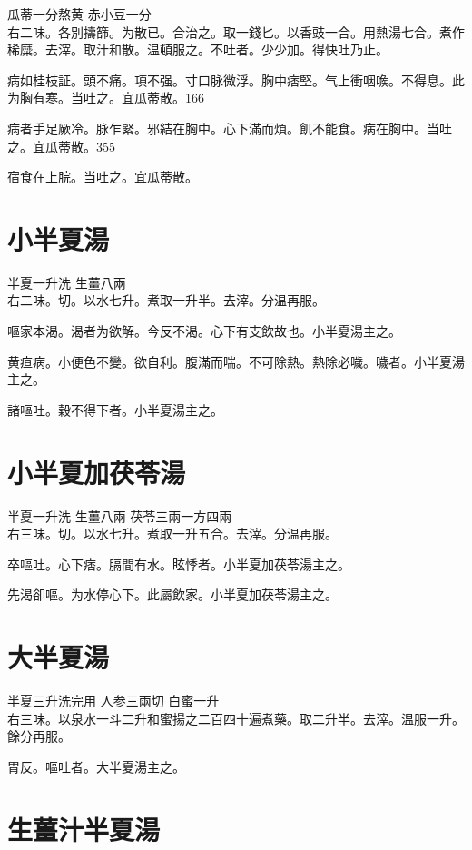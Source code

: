 瓜蒂{\scriptsize 一分熬黄} 赤小豆{\scriptsize 一分}\\
右二味。各別擣篩。为散已。合治之。取一錢匕。以香豉一合。用熱湯七合。煮作稀糜。去滓。取汁和散。温頓服之。不吐者。少少加。得快吐乃止。

病如桂枝証。頭不痛。項不强。寸{\khaai 口}脉微浮。胸中痞堅。气上衝咽㗋。不得息。此为胸有寒。当吐之。宜瓜蒂散。166

病者手足厥冷。脉乍緊。邪結在胸中。心下滿而煩。飢不能食。病在胸中。当吐之。宜瓜蒂散。355

宿食在上脘。当吐之。宜瓜蒂散。

\section{小半夏湯}

半夏{\scriptsize 一升洗} 生薑{\scriptsize 八兩}\\
右二味。切。以水七升。煮取一升半。去滓。分温再服。

嘔家本渴。渴者为欲解。今反不渴。心下有支飲故也。小半夏湯主之。

黄疸病。小便色不變。欲自利。腹滿而喘。不可除熱。熱除必噦。噦者。小半夏湯主之。

諸嘔吐。穀不得下者。小半夏湯主之。

\section{小半夏加茯苓湯}

半夏{\scriptsize 一升洗} 生薑{\scriptsize 八兩} 茯苓{\scriptsize 三兩一方四兩}\\
右三味。切。以水七升。煮取一升五合。去滓。分温再服。

卒嘔吐。心下痞。膈間有水。眩悸者。小半夏加茯苓湯主之。

先渴卻嘔。为水停心下。此屬飲家。小半夏加茯苓湯主之。

\section{大半夏湯}

半夏{\scriptsize 三升洗完用} 人参{\scriptsize 三兩切} 白蜜{\scriptsize 一升}\\
右三味。以泉水一斗二升和蜜揚之二百四十遍煮藥。取二升半。去滓。温服一升。餘分再服。

胃反。嘔吐者。大半夏湯主之。


\section{生薑汁半夏湯}

